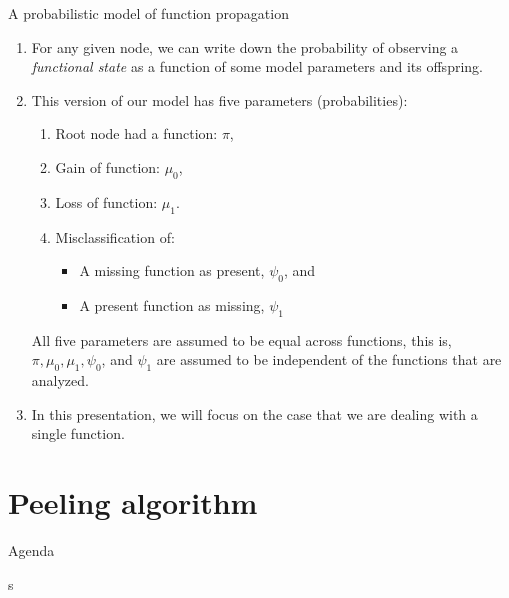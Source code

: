\documentclass[9pt,ignorenonframetext,aspectratio=169]{beamer}
\providecommand{\tightlist}{%
  \setlength{\itemsep}{0pt}\setlength{\parskip}{0pt}}
\begin{document}
\begin{frame}{A probabilistic model of function propagation}

\begin{enumerate}
\def\labelenumi{\arabic{enumi}.}
\item
  For any given node, we can write down the probability of observing a
  \emph{functional state} as a function of some model parameters and its
  offspring. \pause
\item
  This version of our model has five parameters (probabilities): \pause

  \begin{enumerate}
  \def\labelenumii{\alph{enumii}.}
  \tightlist
  \item
    Root node had a function: \(\pi\),
  \item
    Gain of function: \(\mu_0\),
  \item
    Loss of function: \(\mu_1\).
  \item
    Misclassification of:

    \begin{itemize}
    \tightlist
    \item
      A missing function as present, \(\psi_0\), and
    \item
      A present function as missing, \(\psi_1\) \pause
    \end{itemize}
  \end{enumerate}

  All five parameters are assumed to be equal across functions, this is,
  \(\pi, \mu_0, \mu_1, \psi_0\), and \(\psi_1\) are assumed to be
  independent of the functions that are analyzed.\pause
\item
  In this presentation, we will focus on the case that we are dealing
  with a single function.
\end{enumerate}

\end{frame}

\section{Peeling algorithm}\label{peeling-algorithm}

\begin{frame}[t]{Agenda}

\tableofcontents[currentsection]s

\end{frame}
\end{document}
